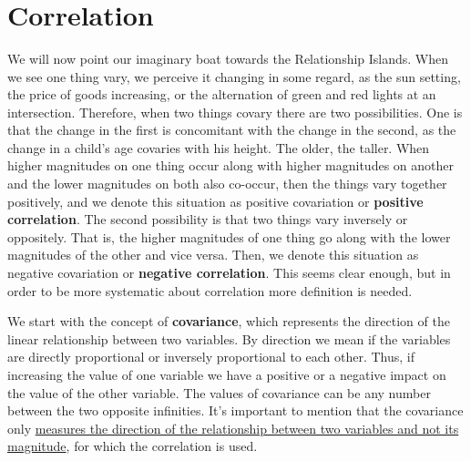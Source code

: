 \documentclass[
]{svmono}
\newenvironment{Shaded}{\begin{snugshade}}{\end{snugshade}}
\newcommand{\CommentTok}[1]{\textcolor[rgb]{0.56,0.35,0.01}{\textit{#1}}}
\newcommand{\FunctionTok}[1]{\textcolor[rgb]{0.13,0.29,0.53}{\textbf{#1}}}
\newcommand{\NormalTok}[1]{#1}
\newcommand{\SpecialCharTok}[1]{\textcolor[rgb]{0.81,0.36,0.00}{\textbf{#1}}}
\begin{document}
~

~

~

\hypertarget{correlation}{%
\section{Correlation}\label{correlation}}

We will now point our imaginary boat towards the Relationship Islands.
When we see one thing vary, we perceive it changing in some regard, as
the sun setting, the price of goods increasing, or the alternation of
green and red lights at an intersection. Therefore, when two things
covary there are two possibilities. One is that the change in the first
is concomitant with the change in the second, as the change in a child's
age covaries with his height. The older, the taller. When higher
magnitudes on one thing occur along with higher magnitudes on another
and the lower magnitudes on both also co-occur, then the things vary
together positively, and we denote this situation as positive
covariation or \textbf{positive correlation}. The second possibility is that
two things vary inversely or oppositely. That is, the higher magnitudes
of one thing go along with the lower magnitudes of the other and vice
versa. Then, we denote this situation as negative covariation or
\textbf{negative correlation}. This seems clear enough, but in order to be
more systematic about correlation more definition is needed.

We start with the concept of \textbf{covariance}, which represents the
direction of the linear relationship between two variables. By direction
we mean if the variables are directly proportional or inversely
proportional to each other. Thus, if increasing the value of one
variable we have a positive or a negative impact on the value of the
other variable. The values of covariance can be any number between the
two opposite infinities. It's important to mention that the covariance
only \ul{measures the direction of the relationship between two variables
and not its magnitude}, for which the correlation is used.

\begin{Shaded}
\end{Shaded}
\end{document}
